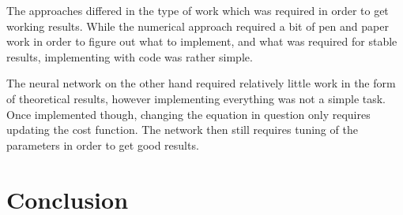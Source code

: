 \documentclass{article}
\theoremstyle{definition}
\begin{document}
The approaches differed in the type of work which was required in order to get working results. While the numerical approach required a bit of pen and paper work in order to figure out what to implement, and what was required for stable results, implementing with code was rather simple.

The neural network on the other hand required relatively little work in the form of theoretical results, however implementing everything was not a simple task. Once implemented though, changing the equation in question only requires updating the cost function. The network then still requires tuning of the parameters in order to get good results.




\section{Conclusion}

\printbibliography
\end{document}
